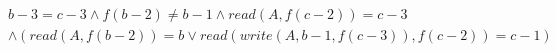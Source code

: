 \begin{align*}
%
& %
b - 3 = c - 3
%
\land
%
f(b - 2)  \neq  b - 1
%
\land
%
\mathit{read}(A,f(c - 2)) = c - 3
~\\~
& %
%
\land
%
(\mathit{read}(A,f(b - 2)) = b \lor \mathit{read}(\mathit{write}(A,b - 1,f(c - 3)),f(c - 2)) = c - 1)
%
\end{align*}
